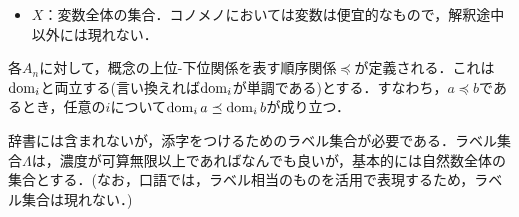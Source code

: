 \documentclass[../../main-detail.tex]{subfiles}
\begin{document}
\begin{definition}[辞書]
\begin{itemize}
\begin{itemize}
            \item $\mathrm{out}\,q\in\{1, V\}$：各添字に対して返す値を，真理値$\Omega^1\simeq\Omega$（$\mathrm{out}\,q = 1$）とするか，クラス$\Omega^V$（$\mathrm{out}\,q = V$）とするかを表す出力標識．\textbf{個体$V$を直接返す冠詞は許さない．}
        \end{itemize}
        $\alpha,\beta\in\{1,V\}$，$\gamma\in\{\Omega,V\}$に対して
        \[
            Q^{\gamma}_{\alpha,\beta} = \{q\in Q \mid \mathrm{arg}\,q=\gamma,\ \mathrm{keep}\,q=\alpha,\ \mathrm{out}\,q=\beta\},\qquad
            Q_{\alpha,\beta} = \bigcup_{\gamma\in\{\Omega,V\}} Q^\gamma_{\alpha,\beta}
        \]
        とする．署名から\textbf{適用結果型}（(Plm-pt)が与える型）が決まる：有限ラベル列$I$に対して
        \[
            \mathrm{Result}(I;\alpha,\beta) := \alpha^I\to\Omega^\beta
            \simeq (\alpha^I\times\beta)\to\Omega.
        \]
        少なくとも以下の種類の冠詞が必要である：
        \begin{itemize}
            \item $Q_{1,1}$：量化子．少なくとも$\forall, \exists$が含まれ，$\mathrm{Most}, \mathrm{Many}$，および$[K], \langle K\rangle$（形式意味論章）もここに入る．$\mathrm{Ind}$（口語「不特定の」）は独立の冠詞とせず，内包動詞の内容対象位置における$\exists$の糖衣とみる（形式意味論章「内容対象方式」．de dicto冠詞$N$を採らないのと同じ理由）．
            \item $Q_{V,1}$：内包化演算子．$L, F$．割り当てを保持して各割り当てに真理値を返す，すなわち充足する割り当てのクラス（$V^I\to\Omega$）を作る．$L$は内包化，$F$は文脈内包化と呼ばれる．
            \item $Q_{1,V}$：証拠演算子．$C, E, K$．$C$は文を成立させる状況のクラス，$E$はその選択肢（情報状態のクラス），$K$は成立する世界のクラスを作る（形式意味論章）．
            \item $Q_{V,V}$：族版演算子．割り当てごとにクラスを返す（$V^I\to\Omega^V$）．$M$（引用符），$\mathrm{Cf}, \mathrm{Kf}$（形式意味論章），および$\mathrm{Lf}$（ラムダ抽象．$\mathrm{arg}\,\mathrm{Lf}=V$）．$M$と$\mathrm{Lf}$の非空の切片は単元クラスである（関数性）．
        \end{itemize}
        現時点で$\mathrm{arg}\,q = V$の冠詞は$\mathrm{Lf}$であるが，項を取る冠詞は今後増えうる．
        \item $X$：変数全体の集合．コノメノにおいては変数は便宜的なもので，解釈途中以外には現れない．
    \end{itemize}
    各$A_n$に対して，概念の上位-下位関係を表す順序関係$\preceq$が定義される．これは$\mathop{\mathrm{dom}}\nolimits_i$と両立する(言い換えれば$\mathop{\mathrm{dom}}\nolimits_i$が単調である)とする．すなわち，$a \preceq b$であるとき，任意の$i$について$\mathop{\mathrm{dom}}\nolimits_i a \preceq \mathop{\mathrm{dom}}\nolimits_i b$が成り立つ．
\end{definition}
\begin{definition}[ラベル集合]
    辞書には含まれないが，添字をつけるためのラベル集合が必要である．ラベル集合$\Lambda$は，濃度が可算無限以上であればなんでも良いが，基本的には自然数全体の集合とする．(なお，口語では，ラベル相当のものを活用で表現するため，ラベル集合は現れない．)
\end{definition}
\end{document}
